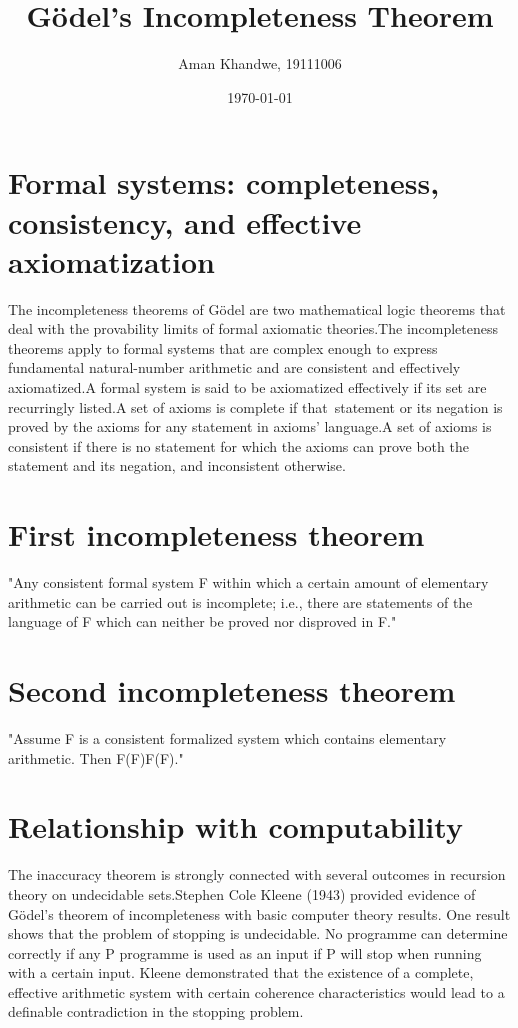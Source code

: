 \documentclass{article}
\title{Gödel's Incompleteness Theorem}
\author{Aman Khandwe, 19111006}
\date{\today}
\begin{document}
\maketitle
\section{Formal systems: completeness, consistency, and effective axiomatization}
The incompleteness theorems of Gödel are two mathematical logic theorems that deal with the provability limits of formal axiomatic theories.The incompleteness theorems apply to formal systems that are complex enough to express fundamental natural-number arithmetic and are consistent and effectively axiomatized.A formal system is said to be axiomatized effectively if its set are recurringly listed.A set of axioms is complete if that statement or its negation is proved by the axioms for any statement in axioms' language.A set of axioms is consistent if there is no statement for which the axioms can prove both the statement and its negation, and inconsistent otherwise.
\section{First incompleteness theorem}
"Any consistent formal system F within which a certain amount of elementary arithmetic can be carried out is incomplete; i.e., there are statements of the language of F which can neither be proved nor disproved in F."
\section{Second incompleteness theorem}
"Assume F is a consistent formalized system which contains elementary arithmetic. Then {\displaystyle F\not {}(F)}{\displaystyle F\not {}(F)}."
\section{Relationship with computability}
The inaccuracy theorem is strongly connected with several outcomes in recursion theory on undecidable sets.Stephen Cole Kleene (1943) provided evidence of Gödel's theorem of incompleteness with basic computer theory results. One result shows that the problem of stopping is undecidable. No programme can determine correctly if any P programme is used as an input if P will stop when running with a certain input. Kleene demonstrated that the existence of a complete, effective arithmetic system with certain coherence characteristics would lead to a definable contradiction in the stopping problem.
\end{document}
